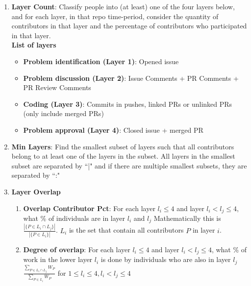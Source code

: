 \documentclass[source/paper/main.tex]{subfiles}
\begin{document}
\begin{enumerate}
    \item \textbf{Layer Count}: Classify people into (at least) one of the four layers below, and for each layer, in that repo time-period, consider the quantity of contributors in that layer and the percentage of contributors who participated in that layer. 
    \\
    \textbf{List of layers}
    \begin{itemize}
        \item \textbf{Problem identification (Layer 1)}: Opened issue 
        \item \textbf{Problem discussion (Layer 2)}: Issue Comments + PR Comments + PR Review Comments
        \item \textbf{Coding (Layer 3)}: Commits in pushes, linked PRs or unlinked PRs (only include merged PRs)
        \item \textbf{Problem approval (Layer 4)}: Closed issue + merged PR
    \end{itemize}
    \item \textbf{Min Layers}: Find the smallest subset of layers such that all contributors belong to at least one of the layers in the subset. All layers in the smallest subset are separated by ``|" and if there are multiple smallest subsets, they are separated by ``:"
    \item \textbf{Layer Overlap}
    \begin{enumerate}
        \item \textbf{Overlap Contributor Pct}: For each layer $l_i \leq 4$ and layer $l_i < l_j \leq 4$, what \% of individuals are in layer $l_i$ and $l_j$ Mathematically this is $\frac{|\{P \in L_i \cap L_j\}|}{|\{P \in L_i\}|}$. 
        $L_i$ is the set that contain all contributors $P$ in layer $i$.
        \item \textbf{Degree of overlap}: For each layer $l_i \leq 4$ and layer $l_i < l_j \leq 4$, what \% of work in the lower layer $l_i$ is done by individuals who are also in layer $l_j$ 
        $\frac{\sum_{P \in L_i \cap L_j} W_P}{\sum_{P \in L_i} W_P}$ for $1 \leq l_i \leq 4, l_i < l_j \leq 4$
        

\end{enumerate}
\end{enumerate}
\end{document}
